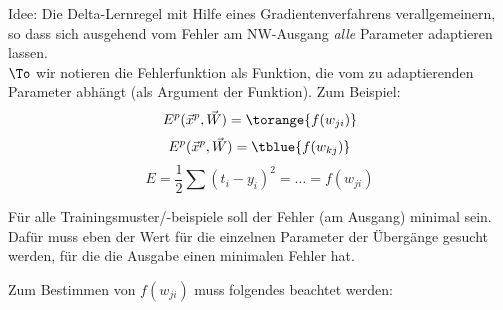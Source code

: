 Idee: Die Delta-Lernregel mit Hilfe eines Gradientenverfahrens verallgemeinern, so dass sich ausgehend vom Fehler am NW-Ausgang \emph{alle} Parameter adaptieren lassen.\\
$\To$ wir notieren die Fehlerfunktion als Funktion, die vom zu adaptierenden Parameter abhängt (als Argument der Funktion). Zum Beispiel:
$$E^p(\vec{x}^p, \vec{W})=\torange{f(w_{ji})}$$
$$E^p(\vec{x}^p, \vec{W})=\tblue{f(w_{kj})}$$
$$E=\frac{1}{2}\sum(t_i-y_i)^2 =  \ldots =f(w_{ji})$$

Für alle Trainingsmuster/-beispiele soll der Fehler (am Ausgang) minimal sein. Dafür muss eben der Wert für die einzelnen Parameter der Übergänge gesucht werden, für die die Ausgabe einen minimalen Fehler hat.

Zum Bestimmen von $f(w_{ji})$ muss folgendes beachtet werden:

